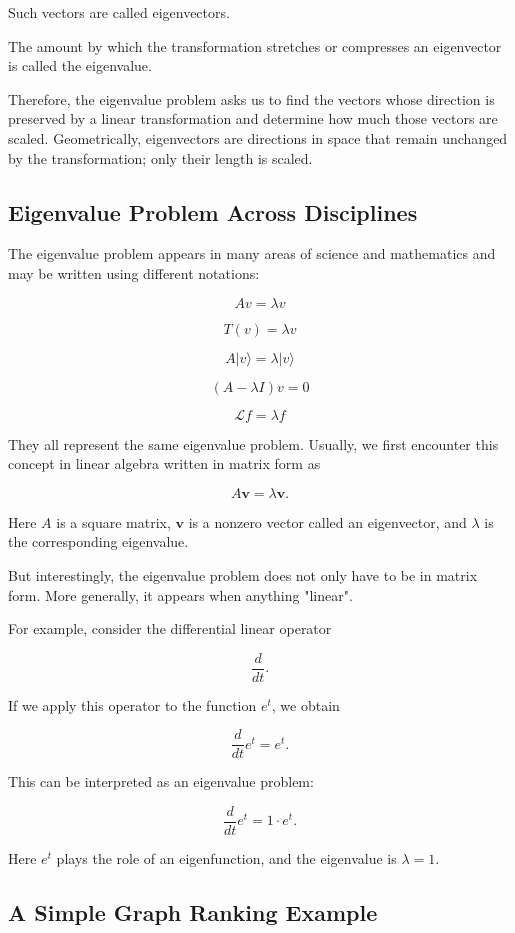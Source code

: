 \documentclass{article}
\begin{document}
Such vectors are called eigenvectors.

The amount by which the transformation stretches or compresses an eigenvector is called
the eigenvalue.

Therefore, the eigenvalue problem asks us to find the vectors whose direction is preserved
by a linear transformation and determine how much those vectors are scaled.
Geometrically, eigenvectors are directions in space that remain unchanged by the transformation; only their length is scaled.

\subsection{Eigenvalue Problem Across Disciplines}

The eigenvalue problem appears in many areas of science and mathematics
and may be written using different notations:

\[
Av = \lambda v
\]

\[
T(v) = \lambda v
\]

\[
A|v\rangle = \lambda |v\rangle
\]

\[
(A - \lambda I)v = 0
\]

\[
\mathcal{L} f = \lambda f
\]

They all represent the same eigenvalue problem. 
Usually, we first encounter this concept in linear algebra written in matrix form as

\[
A\mathbf{v} = \lambda \mathbf{v}.
\]

Here $A$ is a square matrix, $\mathbf{v}$ is a nonzero vector called an eigenvector,
and $\lambda$ is the corresponding eigenvalue.

But interestingly, the eigenvalue problem does not only have to be in matrix form.
More generally, it appears when anything "linear".

For example, consider the differential linear operator

\[
\frac{d}{dt}.
\]

If we apply this operator to the function $e^{t}$, we obtain

\[
\frac{d}{dt} e^{t} = e^{t}.
\]

This can be interpreted as an eigenvalue problem:

\[
\frac{d}{dt} e^{t} = 1 \cdot e^{t}.
\]

Here $e^{t}$ plays the role of an eigenfunction, and the eigenvalue is $\lambda = 1$.

\subsection{A Simple Graph Ranking Example}
\end{document}
